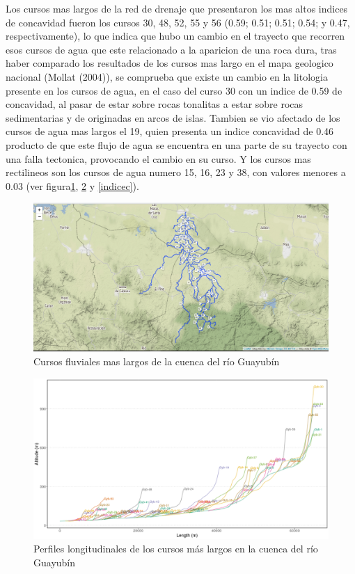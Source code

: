 \documentclass[11pt,]{article}
\begin{document}
Los cursos mas largos de la red de drenaje que presentaron los mas altos
indices de concavidad fueron los cursos 30, 48, 52, 55 y 56 (0.59; 0.51;
0.51; 0.54; y 0.47, respectivamente), lo que indica que hubo un cambio
en el trayecto que recorren esos cursos de agua que este relacionado a
la aparicion de una roca dura, tras haber comparado los resultados de
los cursos mas largo en el mapa geologico nacional (Mollat (2004)), se
comprueba que existe un cambio en la litologia presente en los cursos de
agua, en el caso del curso 30 con un indice de 0.59 de concavidad, al
pasar de estar sobre rocas tonalitas a estar sobre rocas sedimentarias y
de originadas en arcos de islas. Tambien se vio afectado de los cursos
de agua mas largos el 19, quien presenta un indice concavidad de 0.46
producto de que este flujo de agua se encuentra en una parte de su
trayecto con una falla tectonica, provocando el cambio en su curso. Y
los cursos mas rectilineos son los cursos de agua numero 15, 16, 23 y
38, con valores menores a 0.03 (ver figura\ref{lfpnet},
\ref{plongitudinal} y \ref{indicec}).

\begin{figure}
\centering
\includegraphics[width=1.00000\textwidth]{cursos mas largos.png}
\caption{Cursos fluviales mas largos de la cuenca del río
Guayubín\label{lfpnet}}
\end{figure}

\begin{figure}
\centering
\includegraphics[width=1.00000\textwidth]{perfiles longitudinales.png}
\caption{Perfiles longitudinales de los cursos más largos en la cuenca
del río Guayubín\label{plongitudinal}}
\end{figure}
\end{document}
